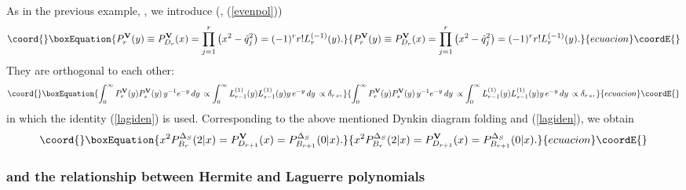 \documentclass[a4paper,12pt]{article}
\begin{document}
As in the previous example, \coordHE{},
we introduce (\coordHE{}, (\ref{evenpol}))
\begin{equation}\coord{}\boxEquation{
   P_r^{\bf V}(y)\equiv P_{D_r}^{\bf V}(x)=
   \prod_{j=1}^{r}\left(x^2-\tilde{q}_j^2\right)
   =(-1)^rr! L_{r}^{(-1)}(y).
}{
   P_r^{\bf V}(y)\equiv P_{D_r}^{\bf V}(x)=
   \prod_{j=1}^{r}\left(x^2-\tilde{q}_j^2\right)
   =(-1)^rr! L_{r}^{(-1)}(y).
}{ecuacion}\coordE{}\end{equation}
They are orthogonal to each other:
\begin{equation}\coord{}\boxEquation{
   \int_{0}^\infty P_r^{\bf V}(y)P_s^{\bf V}(y)\,y^{-1} e^{-y}\,dy\,
   \propto \int_{0}^\infty L_{r-1}^{(1)}(y)L_{s-1}^{(1)}(y)
   y\, e^{-y}\,dy\,
   \propto\delta_{r\,s},
}{
   \int_{0}^\infty P_r^{\bf V}(y)P_s^{\bf V}(y)\,y^{-1} e^{-y}\,dy\,
   \propto \int_{0}^\infty L_{r-1}^{(1)}(y)L_{s-1}^{(1)}(y)
   y\, e^{-y}\,dy\,
   \propto\delta_{r\,s},
}{ecuacion}\coordE{}\end{equation}
in which the identity (\ref{lagiden}) is used.
Corresponding to the above mentioned Dynkin diagram folding
\coordHE{} and (\ref{lagiden}), we obtain
\begin{equation}\coord{}\boxEquation{
   x^2P_{B_r}^{\Delta_S}(2|x)=P_{D_{r+1}}^{\bf V}(x)
   =P_{B_{r+1}}^{\Delta_S}(0|x).
   \label{drbrredV}
}{
   x^2P_{B_r}^{\Delta_S}(2|x)=P_{D_{r+1}}^{\bf V}(x)
   =P_{B_{r+1}}^{\Delta_S}(0|x).
   }{ecuacion}\coordE{}\end{equation}

\subsubsection{\coordHE{} and the relationship between Hermite
and Laguerre polynomials}
\end{document}
